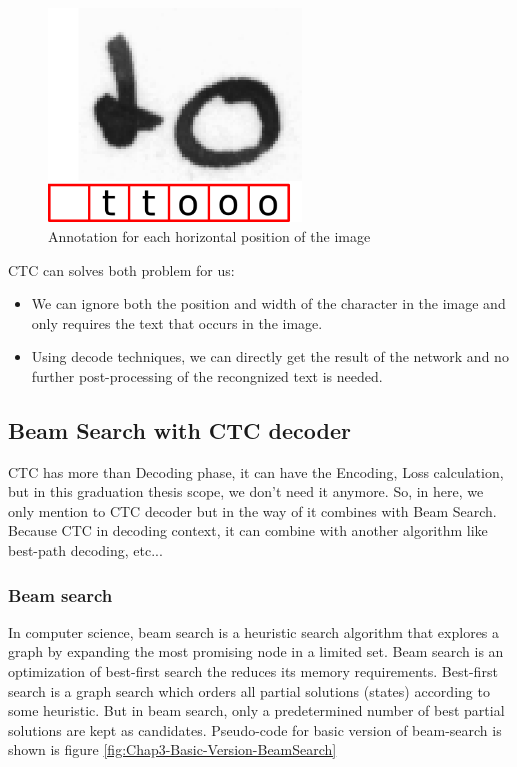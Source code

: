 \begin{figure}[H]
	\centering
	\includegraphics[width=0.6\textwidth]{img/Chap3/Annotation-image-CTC}
	\caption{ Annotation for each horizontal position of the image }
	\label{fig:Chap3-Annottion-image-CTC}
\end{figure}
CTC can solves both problem for us:
\begin{itemize}
	\item We can ignore both the position and width of the character in the image
	      and only requires the text that occurs in the image.
	\item Using decode techniques, we can directly get the result of the network and
	      no further post-processing of the recongnized text is needed. 
\end{itemize}

\subsection{ Beam Search with CTC decoder }
CTC has more than Decoding phase, it can have the Encoding, Loss calculation, but in
this graduation thesis scope, we don't need it anymore. So, in here, we only
mention to CTC decoder but in the way of it combines with Beam Search. Because CTC
in decoding context, it can combine with another algorithm like best-path decoding, etc...

\subsubsection{ Beam search }
In computer science, beam search is a heuristic search algorithm that
explores a graph by expanding the most promising node in a limited set.
Beam search is an optimization of best-first search the reduces its memory
requirements. Best-first search is a graph search which orders all
partial solutions (states) according to some heuristic. But in beam search,
only a predetermined number of best partial solutions are kept as candidates.
Pseudo-code for basic version of beam-search is shown is figure \ref{fig:Chap3-Basic-Version-BeamSearch}

